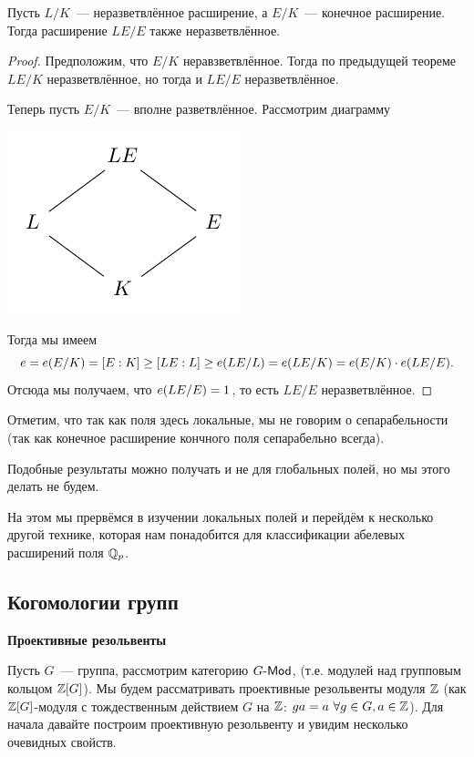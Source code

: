 	\begin{corollary}
		Пусть $L/K$~--- неразветвлённое расширение, а $E/K$~--- конечное расширение. Тогда расширение $LE/E$ также неразветвлённое.  
	\end{corollary}
	\begin{proof}
		Предположим, что $E/K$ неравзветвлённое. Тогда по предыдущей теореме $LE/K$ неразветвлённое, но тогда и $LE/E$ неразветвлённое. 

		Теперь пусть $E/K$~--- вполне разветвлённое. Рассмотрим диаграмму 

		\begin{center}
			\includegraphics{lectures/5/pictures/pic_4.pdf}
		\end{center}

		Тогда мы имеем
		\[
			e = e\lr*{E/K} = [E : K] \ge [LE : L] \ge e\lr*{LE/L} = e\lr*{LE/K} = e\lr*{E/K} \cdot e\lr*{LE/E}.
		\]
		Отсюда мы получаем, что $e\lr*{LE/E} = 1$, то есть $LE/E$ неразветвлённое. 
	\end{proof}

	\begin{remark}
		Отметим, что так как поля здесь локальные, мы не говорим о сепарабельности (так как конечное расширение кончного поля сепарабельно всегда). 

		Подобные результаты можно получать и не для глобальных полей, но мы этого делать не будем. 
	\end{remark}

	На этом мы прервёмся в изучении локальных полей и перейдём к несколько другой технике, которая нам понадобится для классификации абелевых расширений поля $\mathbb{Q}_{p}$. 

	\subsection{Когомологии групп}

	\noindent\bf{Проективные резольвенты}

	Пусть $G$~--- группа, рассмотрим категорию $G\text{-}\mathsf{Mod}$, (т.е. модулей над групповым кольцом $\mathbb{Z}[G]$). Мы будем рассматривать проективные резольвенты модуля $\mathbb{Z}$ (как $\mathbb{Z}[G]$-модуля с тождественным действием $G$ на $\mathbb{Z}$: $ga = a \ \forall g \in G, a \in \mathbb{Z}$). Для начала давайте построим проективную резольвенту и увидим несколько очевидных свойств. 

